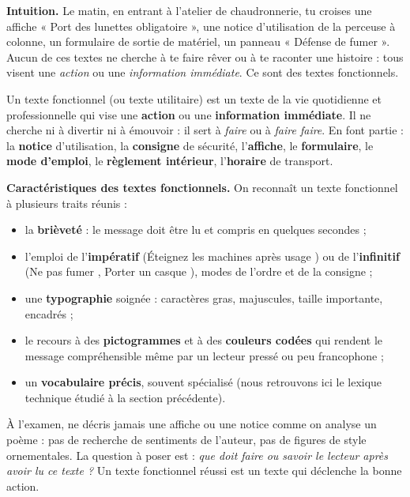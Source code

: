 \documentclass[11pt]{article}
\newcommand{\cle}[1]{{\popxbold\color{popdark}#1}}
\newcounter{popsec}
\newcounter{popsub}
\newcommand{\courssub}[1]{%
  \stepcounter{popsub}%
  \par\vspace{9pt}\noindent{\popxbold\fontsize{11.5}{13}\selectfont\color{popink}{\color{poporange}\thepopsec.\thepopsub}\hspace{6pt}#1}\par\nopagebreak\vspace{4pt}
}
\begin{document}
\courssub{Qu'est-ce qu'un texte fonctionnel ?}

\textbf{Intuition.} Le matin, en entrant à l'atelier de chaudronnerie, tu croises une affiche « Port des lunettes obligatoire », une notice d'utilisation de la perceuse à colonne, un formulaire de sortie de matériel, un panneau « Défense de fumer ». Aucun de ces textes ne cherche à te faire rêver ou à te raconter une histoire : tous visent une \emph{action} ou une \emph{information immédiate}. Ce sont des textes fonctionnels.

\begin{definition}
Un \cle{texte fonctionnel} (ou texte utilitaire) est un texte de la vie quotidienne et professionnelle qui vise une \textbf{action} ou une \textbf{information immédiate}. Il ne cherche ni à divertir ni à émouvoir : il sert à \emph{faire} ou à \emph{faire faire}. En font partie : la \textbf{notice} d'utilisation, la \textbf{consigne} de sécurité, l'\textbf{affiche}, le \textbf{formulaire}, le \textbf{mode d'emploi}, le \textbf{règlement intérieur}, l'\textbf{horaire} de transport.
\end{definition}

\textbf{Caractéristiques des textes fonctionnels.} On reconnaît un texte fonctionnel à plusieurs traits réunis :

\begin{itemize}
\item la \textbf{brièveté} : le message doit être lu et compris en quelques secondes ;
\item l'emploi de l'\textbf{impératif} (\og Éteignez les machines après usage \fg{}) ou de l'\textbf{infinitif} (\og Ne pas fumer \fg{}, \og Porter un casque \fg{}), modes de l'ordre et de la consigne ;
\item une \textbf{typographie} soignée : caractères gras, majuscules, taille importante, encadrés ;
\item le recours à des \textbf{pictogrammes} et à des \textbf{couleurs codées} qui rendent le message compréhensible même par un lecteur pressé ou peu francophone ;
\item un \textbf{vocabulaire précis}, souvent spécialisé (nous retrouvons ici le lexique technique étudié à la section précédente).
\end{itemize}

\begin{attention}
À l'examen, ne décris jamais une affiche ou une notice comme on analyse un poème : pas de recherche de sentiments de l'auteur, pas de figures de style ornementales. La question à poser est : \emph{que doit faire ou savoir le lecteur après avoir lu ce texte ?} Un texte fonctionnel réussi est un texte qui déclenche la bonne action.
\end{attention}
\end{document}
